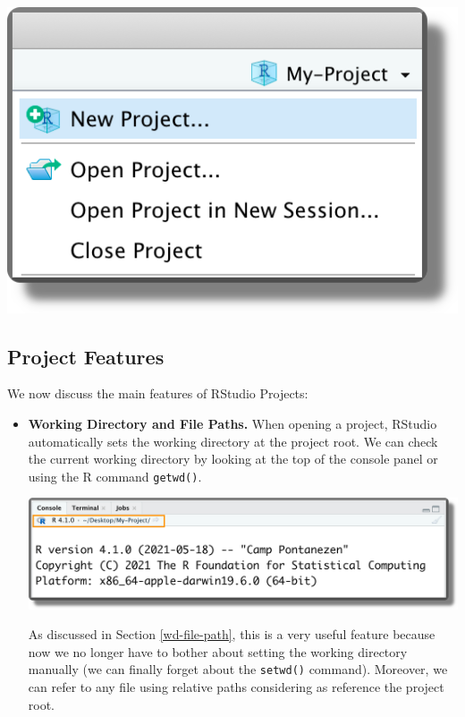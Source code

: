 \documentclass[
  11pt,
]{book}
\begin{document}
\begin{enumerate}
  \begin{center}\includegraphics[width=0.4\linewidth]{images/projects/proj-menu} \end{center}
\end{enumerate}

\hypertarget{project-features}{%
\subsection{Project Features}\label{project-features}}

We now discuss the main features of RStudio Projects:

\begin{itemize}
\item
  \textbf{Working Directory and File Paths.} When opening a project, RStudio automatically sets the working directory at the project root. We can check the current working directory by looking at the top of the console panel or using the R command \texttt{getwd()}.

  \begin{center}\includegraphics[width=0.9\linewidth]{images/projects/proj-wd} \end{center}

  As discussed in Section \ref{wd-file-path}, this is a very useful feature because now we no longer have to bother about setting the working directory manually (we can finally forget about the \texttt{setwd()} command). Moreover, we can refer to any file using relative paths considering as reference the project root.
\end{itemize}
\end{document}

